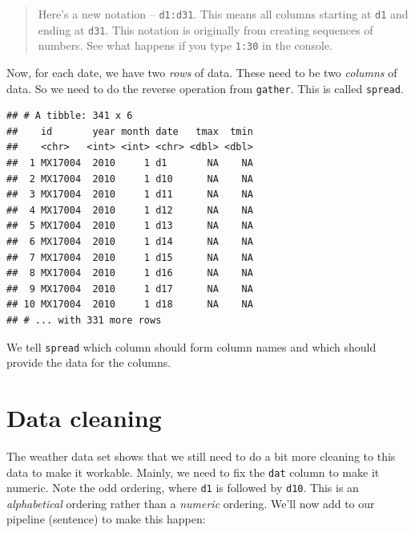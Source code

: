 \documentclass[12pt,letterpaperpaper,openany]{book}
\newenvironment{Shaded}{\begin{snugshade}}{\end{snugshade}}
\newcommand{\KeywordTok}[1]{\textcolor[rgb]{0.13,0.29,0.53}{\textbf{#1}}}
\newcommand{\NormalTok}[1]{#1}
\newcommand{\OperatorTok}[1]{\textcolor[rgb]{0.81,0.36,0.00}{\textbf{#1}}}
\newcommand{\StringTok}[1]{\textcolor[rgb]{0.31,0.60,0.02}{#1}}
\begin{document}
\begin{quote}
Here's a new notation -- \texttt{d1:d31}. This means all columns starting at \texttt{d1} and ending at \texttt{d31}. This notation
is originally from creating sequences of numbers. See what happens if you type \texttt{1:30} in the console.
\end{quote}

Now, for each date, we have two \emph{rows} of data. These need to be two \emph{columns} of data. So we need to do the
reverse operation from \texttt{gather}. This is called \texttt{spread}.

\begin{Shaded}
\end{Shaded}

\begin{verbatim}
## # A tibble: 341 x 6
##    id       year month date   tmax  tmin
##    <chr>   <int> <int> <chr> <dbl> <dbl>
##  1 MX17004  2010     1 d1       NA    NA
##  2 MX17004  2010     1 d10      NA    NA
##  3 MX17004  2010     1 d11      NA    NA
##  4 MX17004  2010     1 d12      NA    NA
##  5 MX17004  2010     1 d13      NA    NA
##  6 MX17004  2010     1 d14      NA    NA
##  7 MX17004  2010     1 d15      NA    NA
##  8 MX17004  2010     1 d16      NA    NA
##  9 MX17004  2010     1 d17      NA    NA
## 10 MX17004  2010     1 d18      NA    NA
## # ... with 331 more rows
\end{verbatim}

We tell \texttt{spread} which column should form column names and which should provide the data for the columns.

\hypertarget{data-cleaning}{%
\section{Data cleaning}\label{data-cleaning}}

The weather data set shows that we still need to do a bit more cleaning to this data to make it workable.
Mainly, we need to fix the \texttt{dat} column to make it numeric. Note the odd ordering, where \texttt{d1} is followed by \texttt{d10}. This
is an \emph{alphabetical} ordering rather than a \emph{numeric} ordering. We'll now add to our pipeline (sentence) to make this
happen:
\end{document}
